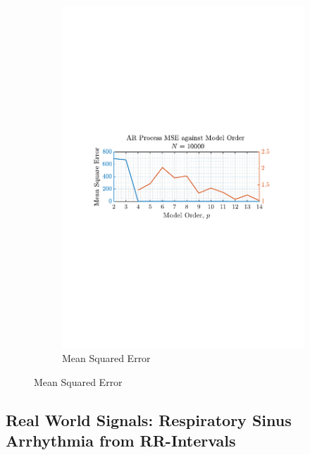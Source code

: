 \documentclass[12pt]{article}
\begin{document}
\begin{figure}[H]
\begin{subfigure}{0.49\textwidth}
			\includegraphics[trim={2.2cm 11.2cm 3.15cm  11.2cm}, clip, width=\textwidth]{../MATLAB/figures/q1_4c_fig16.pdf} 
			\captionsetup{justification=centering}
			\caption{Mean Squared Error}
		\end{subfigure}
		\label{fig: 1-4c}
	\end{figure}
	
	\subsection{Real World Signals: Respiratory Sinus Arrhythmia from RR-Intervals} \label{sec: 1-5-real-world-signals}
\end{document}
